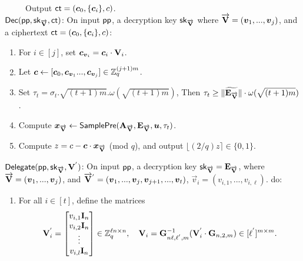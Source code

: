 \documentclass{llncs}
\begin{document}
\begin{appendix}
\begin{enumerate}
\end{enumerate}
~~~~~Output $\mathsf{ct}=(\boldsymbol{c}_{0}, \{\boldsymbol{c}_{i}\}, c)$.\\[0.4cm]
$\mathsf{Dec}(\mathsf{pp}, \mathsf{sk}_{\overrightarrow{\mathbf{V}}}, \mathsf{ct})$: On input $\mathsf{pp}$, a decryption key $\mathsf{sk}_{\overrightarrow{\mathbf{V}}}$ where $\overrightarrow{\mathbf{V}}=(\boldsymbol{v}_{1},...,\boldsymbol{v}_{j})$, and a ciphertext $\mathsf{ct}=(\boldsymbol{c}_{0}, \{\boldsymbol{c}_{i}\}, c)$:
\begin{enumerate}
\item For $i \in [j]$, set $\boldsymbol{c}_{\boldsymbol{v}_{i}}=\boldsymbol{c}_{i}\cdot \mathbf{V}_{i}$.\\
\item Let $\boldsymbol{c} \leftarrow [\boldsymbol{c}_{0},\boldsymbol{c}_{\boldsymbol{v}_{1}}...,\boldsymbol{c}_{\boldsymbol{v}_{j}}] \in \mathbb{Z}^{(j+1)m}_{q}$.\\
\item Set $\tau_{t}=\sigma_{t}.\sqrt{(t+1)m}.\omega(\sqrt{(t+1)m})$, Then $\tau_{t}\geq \| \widetilde{\mathbf{E}_{\overrightarrow{\mathbf{V}}}} \|\cdot \omega(\sqrt{(t+1)m})$.\\
\item Compute $\boldsymbol{x}_{\overrightarrow{\mathbf{V}}} \leftarrow \mathsf{SamplePre}(\mathbf{A}_{\overrightarrow{\mathbf{V}}}, \mathbf{E}_{\overrightarrow{\mathbf{V}}}, \boldsymbol{u}, \tau_{t})$.\\
\item Compute $z=c-\boldsymbol{c}\cdot \boldsymbol{x}_{\overrightarrow{\mathbf{V}}}$ (mod $q$), and output $\lfloor (2/q)z \rceil \in \{0,1\}$.
\end{enumerate}
$\mathsf{Delegate}(\mathsf{pp}, \mathsf{sk}_{\overrightarrow{\mathbf{V}}}, \mathbf{V}^{'})$: On input $\mathsf{pp}$, a decryption key $\mathsf{sk}_{\overrightarrow{\mathbf{V}}}=\mathbf{E}_{\overrightarrow{\mathbf{V}}}$, where $\overrightarrow{\mathbf{V}}=(\boldsymbol{v}_{1},...,\boldsymbol{v}_{j})$, and $\overrightarrow{\mathbf{V}}^{'}=(\boldsymbol{v}_{1},...,\boldsymbol{v}_{j},\boldsymbol{v}_{j+1},...,\boldsymbol{v}_{t})$, $\vec{v}_{i}=(v_{i,1},...,v_{i,\ell})$. do:
\begin{enumerate}
\item For all $i \in [t]$, define the matrices
\begin{equation}
 \mathbf{V}^{'}_{i}= \begin{bmatrix}
v_{i,1} \mathbf{I}_{n}\\
v_{i,2} \mathbf{I}_{n}\\
\vdots\\
v_{i,l} \mathbf{I}_{n}
\end{bmatrix} \in \mathbb{Z}^{\ell n \times n}_{q},~~~ \mathbf{V}_{i}=\mathbf{G}^{-1}_{n\ell,\ell^{'},m}(\mathbf{V}^{'}_{i}\cdot \mathbf{G}_{n,2,m}) \in [\ell^{'}]^{m \times m}.
\end{equation}

\end{enumerate}
\end{appendix}
\end{document}
